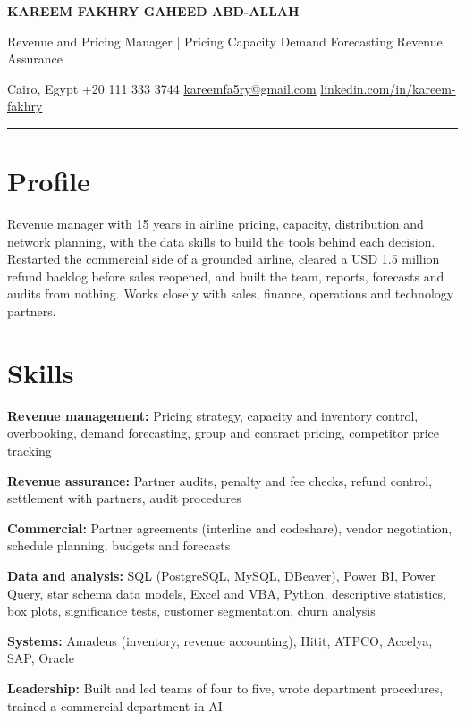 \documentclass[10pt,a4paper]{article}
\begin{document}
{\LARGE\bfseries KAREEM FAKHRY GAHEED ABD-ALLAH}\par\vspace{3pt}
{\color{muted}Revenue and Pricing Manager  |  Pricing \textperiodcentered{} Capacity \textperiodcentered{} Demand Forecasting \textperiodcentered{} Revenue Assurance}\par\vspace{3pt}
{\small\color{muted}Cairo, Egypt \enspace\textperiodcentered\enspace +20 111 333 3744 \enspace\textperiodcentered\enspace \href{mailto:kareemfa5ry@gmail.com}{kareemfa5ry@gmail.com} \enspace\textperiodcentered\enspace \href{https://linkedin.com/in/kareem-fakhry}{linkedin.com/in/kareem-fakhry}}\par\vspace{2pt}
{\color{rule}\rule{\linewidth}{0.6pt}}

\section{Profile}
Revenue manager with 15 years in airline pricing, capacity, distribution and network planning, with the data skills to build the tools behind each decision. Restarted the commercial side of a grounded airline, cleared a USD 1.5 million refund backlog before sales reopened, and built the team, reports, forecasts and audits from nothing. Works closely with sales, finance, operations and technology partners.\par

\section{Skills}
\textbf{Revenue management:} Pricing strategy, capacity and inventory control, overbooking, demand forecasting, group and contract pricing, competitor price tracking\par\vspace{1pt}
\textbf{Revenue assurance:} Partner audits, penalty and fee checks, refund control, settlement with partners, audit procedures\par\vspace{1pt}
\textbf{Commercial:} Partner agreements (interline and codeshare), vendor negotiation, schedule planning, budgets and forecasts\par\vspace{1pt}
\textbf{Data and analysis:} SQL (PostgreSQL, MySQL, DBeaver), Power BI, Power Query, star schema data models, Excel and VBA, Python, descriptive statistics, box plots, significance tests, customer segmentation, churn analysis\par\vspace{1pt}
\textbf{Systems:} Amadeus (inventory, revenue accounting), Hitit, ATPCO, Accelya, SAP, Oracle\par\vspace{1pt}
\textbf{Leadership:} Built and led teams of four to five, wrote department procedures, trained a commercial department in AI\par\vspace{1pt}
\end{document}
